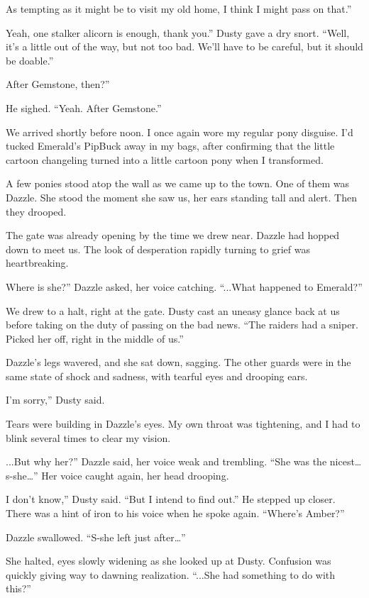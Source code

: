 \leavevmode{}As tempting as it might be to visit my old home, I think I might pass on that.”

\leavevmode{}Yeah, one stalker alicorn is enough, thank you.” Dusty gave a dry snort. “Well, it’s a little out of the way, but not too bad. We’ll have to be careful, but it should be doable.”

\leavevmode{}After Gemstone, then?”

He sighed. “Yeah. After Gemstone.”

{\br}%
We arrived shortly before noon. I once again wore my regular pony disguise. I’d tucked Emerald’s PipBuck away in my bags, after confirming that the little cartoon changeling turned into a little cartoon pony when I transformed.

A few ponies stood atop the wall as we came up to the town. One of them was Dazzle. She stood the moment she saw us, her ears standing tall and alert. Then they drooped.

The gate was already opening by the time we drew near. Dazzle had hopped down to meet us. The look of desperation rapidly turning to grief was heartbreaking.

\leavevmode{}Where is she?” Dazzle asked, her voice catching. “...What happened to Emerald?”

We drew to a halt, right at the gate. Dusty cast an uneasy glance back at us before taking on the duty of passing on the bad news. “The raiders had a sniper. Picked her off, right in the middle of us.”

Dazzle’s legs wavered, and she sat down, sagging. The other guards were in the same state of shock and sadness, with tearful eyes and drooping ears.

\leavevmode{}I’m sorry,” Dusty said.

Tears were building in Dazzle’s eyes. My own throat was tightening, and I had to blink several times to clear my vision.

\leavevmode{}...But why her?” Dazzle said, her voice weak and trembling. “She was the nicest… s-she…” Her voice caught again, her head drooping.

\leavevmode{}I don’t know,” Dusty said. “But I intend to find out.” He stepped up closer. There was a hint of iron to his voice when he spoke again. “Where’s Amber?”

Dazzle swallowed. “S-she left just after…”

She halted, eyes slowly widening as she looked up at Dusty. Confusion was quickly giving way to dawning realization. “...She had something to do with this?”

